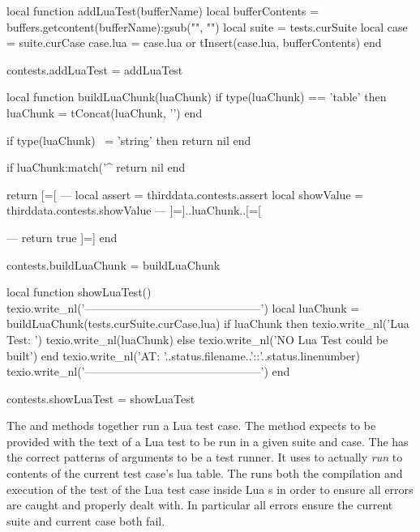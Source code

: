 \startLuaCode
local function addLuaTest(bufferName)
  local bufferContents = buffers.getcontent(bufferName):gsub("", "\n")
  local suite = tests.curSuite
  local case  = suite.curCase
  case.lua    = case.lua or {}
  tInsert(case.lua, bufferContents)
end

contests.addLuaTest = addLuaTest

local function buildLuaChunk(luaChunk)
  if type(luaChunk) == 'table' then
    luaChunk = tConcat(luaChunk, '\n')
  end

  if type(luaChunk) ~= 'string' then
    return nil
  end

  if luaChunk:match('^%
    return nil
  end

  return [=[
---
local assert    = thirddata.contests.assert
local showValue = thirddata.contests.showValue
---
]=]..luaChunk..[=[

---
return true
]=]
end

contests.buildLuaChunk = buildLuaChunk

local function showLuaTest()
  texio.write_nl('-----------------------------------------------')
  local luaChunk = buildLuaChunk(tests.curSuite.curCase.lua)
  if luaChunk then
    texio.write_nl('Lua Test: ')
    texio.write_nl(luaChunk)
  else
    texio.write_nl('NO Lua Test could be built')
  end
  texio.write_nl('AT: '..status.filename..'::'..status.linenumber)
  texio.write_nl('-----------------------------------------------')
end

contests.showLuaTest = showLuaTest
\stopLuaCode

The  and  methods together run a 
Lua test case. The  method expects to be provided with 
the text of a Lua test to be run in a given suite and case. The 
 has the correct patterns of arguments to be a 
test runner. It uses  to actually \emph{run} to contents 
of the current test case's lua table. The  runs both the 
compilation and execution of the test of the Lua test case inside Lua 
s in order to ensure all errors are caught and properly dealt 
with. In particular all errors ensure the current suite and current case 
both fail. 

